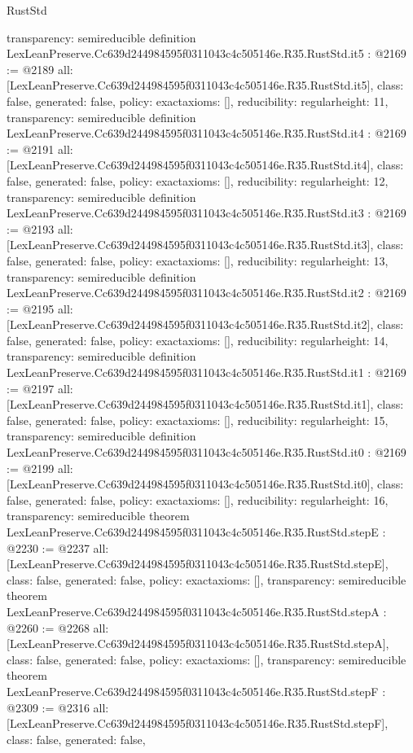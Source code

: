 \begin{lexlean}{RustStd}
\begin{coremodule}
{  transparency: semireducible
}
definition LexLeanPreserve.Cc639d244984595f0311043c4c505146e.R35.RustStd.it5 : @2169 := @2189 {
  all: [LexLeanPreserve.Cc639d244984595f0311043c4c505146e.R35.RustStd.it5],
  class: false,
  generated: false,
  policy: exact{axioms: []},
  reducibility: regular{height: 11},
  transparency: semireducible
}
definition LexLeanPreserve.Cc639d244984595f0311043c4c505146e.R35.RustStd.it4 : @2169 := @2191 {
  all: [LexLeanPreserve.Cc639d244984595f0311043c4c505146e.R35.RustStd.it4],
  class: false,
  generated: false,
  policy: exact{axioms: []},
  reducibility: regular{height: 12},
  transparency: semireducible
}
definition LexLeanPreserve.Cc639d244984595f0311043c4c505146e.R35.RustStd.it3 : @2169 := @2193 {
  all: [LexLeanPreserve.Cc639d244984595f0311043c4c505146e.R35.RustStd.it3],
  class: false,
  generated: false,
  policy: exact{axioms: []},
  reducibility: regular{height: 13},
  transparency: semireducible
}
definition LexLeanPreserve.Cc639d244984595f0311043c4c505146e.R35.RustStd.it2 : @2169 := @2195 {
  all: [LexLeanPreserve.Cc639d244984595f0311043c4c505146e.R35.RustStd.it2],
  class: false,
  generated: false,
  policy: exact{axioms: []},
  reducibility: regular{height: 14},
  transparency: semireducible
}
definition LexLeanPreserve.Cc639d244984595f0311043c4c505146e.R35.RustStd.it1 : @2169 := @2197 {
  all: [LexLeanPreserve.Cc639d244984595f0311043c4c505146e.R35.RustStd.it1],
  class: false,
  generated: false,
  policy: exact{axioms: []},
  reducibility: regular{height: 15},
  transparency: semireducible
}
definition LexLeanPreserve.Cc639d244984595f0311043c4c505146e.R35.RustStd.it0 : @2169 := @2199 {
  all: [LexLeanPreserve.Cc639d244984595f0311043c4c505146e.R35.RustStd.it0],
  class: false,
  generated: false,
  policy: exact{axioms: []},
  reducibility: regular{height: 16},
  transparency: semireducible
}
theorem LexLeanPreserve.Cc639d244984595f0311043c4c505146e.R35.RustStd.stepE : @2230 := @2237 {
  all: [LexLeanPreserve.Cc639d244984595f0311043c4c505146e.R35.RustStd.stepE],
  class: false,
  generated: false,
  policy: exact{axioms: []},
  transparency: semireducible
}
theorem LexLeanPreserve.Cc639d244984595f0311043c4c505146e.R35.RustStd.stepA : @2260 := @2268 {
  all: [LexLeanPreserve.Cc639d244984595f0311043c4c505146e.R35.RustStd.stepA],
  class: false,
  generated: false,
  policy: exact{axioms: []},
  transparency: semireducible
}
theorem LexLeanPreserve.Cc639d244984595f0311043c4c505146e.R35.RustStd.stepF : @2309 := @2316 {
  all: [LexLeanPreserve.Cc639d244984595f0311043c4c505146e.R35.RustStd.stepF],
  class: false,
  generated: false,
}
\end{coremodule}
\end{lexlean}
